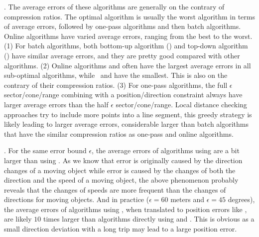{. The average errors of these algorithms  are generally on the contrary of compression ratios. The optimal algorithm is usually  the worst algorithm in terms of average errors, followed by one-pass algorithms and then batch algorithms.
Online algorithms have varied average errors, ranging from the best to the worst.
(1) For batch algorithms, both bottom-up algorithm (\tpa) and top-down algorithm (\dpa) have similar average errors, and they are pretty good compared with other algorithms.
%
(2) Online algorithms \bqsa and \opwa often have the largest average errors in all sub-optimal algorithms, while \dagots~and \squishe have the smallest. This is also on the contrary of their compression ratios.
%
(3) For one-pass algorithms, the full $\epsilon$ sector/cone/range combining with a position/direction constraint always have larger average errors than the half $\epsilon$ sector/cone/range.
%
Local distance checking approaches try to include more points into a line segment, this greedy strategy is likely leading to larger average errors, considerable larger than batch algorithms that have the similar compression ratios as one-pass and online algorithms.


.
For the same error bound $\epsilon$, the average errors of algorithms using \sed are a bit larger than using \ped. {As we know that \ped error is originally caused by the direction changes of a moving object while \sed error is caused by the changes of both the direction and the speed of a moving object, the above phenomenon probably reveals that the changes of speeds are more frequent than the changes of directions for moving objects.}
%
And in practice (\eg $\epsilon = 60$ meters and $\epsilon = 45$ degrees), the average errors of algorithms using \dad, when translated to position errors like \ped, are likely $10$ times larger than algorithms directly using \ped and \sed. This is obvious as a small direction deviation with a long trip may lead to a large position error.










}

